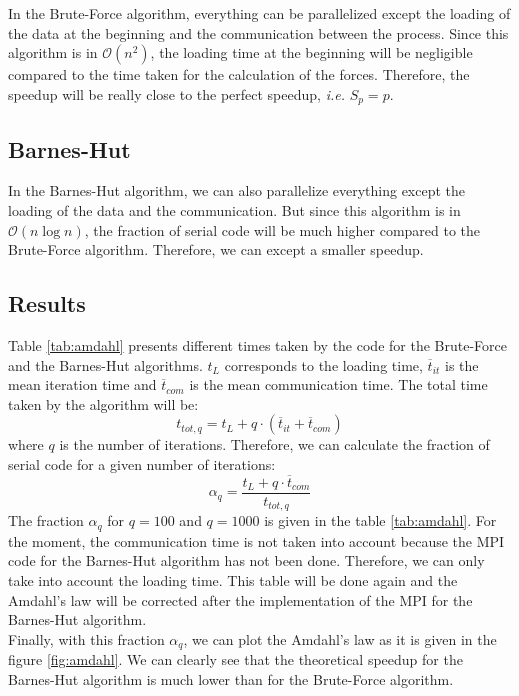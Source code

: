 \documentclass[11pt,a4paper]{article}
\begin{document}
In the Brute-Force algorithm, everything can be parallelized except the loading of the data at the beginning and the communication between the process. Since this algorithm is in $\mathcal{O}(n^2)$, the loading time at the beginning will be negligible compared to the time taken for the calculation of the forces. Therefore, the speedup will be really close to the perfect speedup, {\it i.e.} $S_p = p$.

\subsection{Barnes-Hut}

In the Barnes-Hut algorithm, we can also parallelize everything except the loading of the data and the communication. But since this algorithm is in $\mathcal{O}(n\log n)$, the fraction of serial code will be much higher compared to the Brute-Force algorithm. Therefore, we can except a smaller speedup.

\subsection{Results}

Table \ref{tab:amdahl} presents different times taken by the code for the Brute-Force and the Barnes-Hut algorithms. $t_L$ corresponds to the loading time, $\overline{t}_{it}$ is the mean iteration time and  $\overline{t}_{com}$ is the mean communication time. The total time taken by the algorithm will be:
\begin{equation}
t_{tot,q} = t_L + q\cdot(\overline{t}_{it} + \overline{t}_{com})
\end{equation}
where $q$ is the number of iterations. Therefore, we can calculate the fraction of serial code for a given number of iterations:
\begin{equation}
\alpha_q = \frac{t_L + q\cdot \overline{t}_{com}}{t_{tot,q}}
\end{equation}
The fraction $\alpha_q$ for $q=100$ and $q=1000$ is given in the table \ref{tab:amdahl}. For the moment, the communication time is not taken into account because the MPI code for the Barnes-Hut algorithm has not been done. Therefore, we can only take into account the loading time. This table will be done again and the Amdahl's law will be corrected after the implementation of the MPI for the Barnes-Hut algorithm.
\\
Finally, with this fraction $\alpha_q$, we can plot the Amdahl's law as it is given in the figure \ref{fig:amdahl}. We can clearly see that the theoretical speedup for the Barnes-Hut algorithm is much lower than for the Brute-Force algorithm. 
\end{document}
